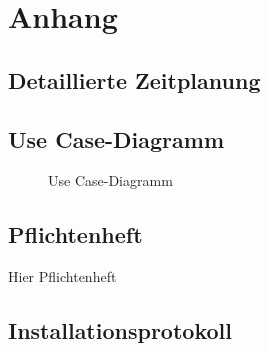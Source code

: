  \section{Anhang}
 \subsection{Detaillierte Zeitplanung}
 \label{app:Zeitplanung}



\clearpage
 \subsection{Use Case-Diagramm}\label{usecasediagram}

 \begin{figure}[htb]
 \centering
 \caption{Use Case-Diagramm}
  \label{app:UseCase}

 \end{figure}

% 

 \clearpage

 
 \clearpage
 \subsection{Pflichtenheft}\label{pflichtenheft}
 Hier Pflichtenheft
 \clearpage

  \subsection{Installationsprotokoll}\label{installprotocoll}
  
  \clearpage

